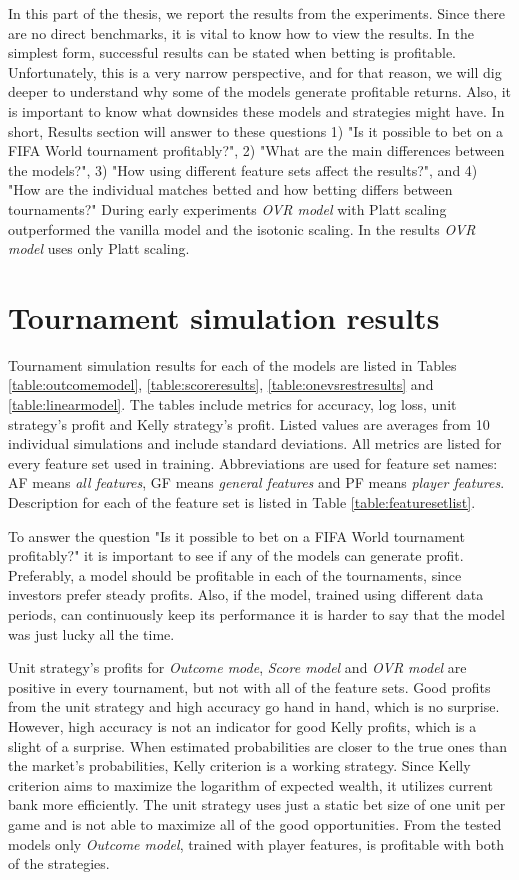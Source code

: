 In this part of the thesis, we report the results from the experiments. Since there are no direct benchmarks, it is vital to know how to view the results. In the simplest form, successful results can be stated when betting is profitable. Unfortunately, this is a very narrow perspective, and for that reason, we will dig deeper to understand why some of the models generate profitable returns. Also, it is important to know what downsides these models and strategies might have.  In short, Results section will answer to these questions 1) "Is it possible to bet on a FIFA World tournament profitably?",  2) "What are the main differences between the models?", 3) "How using different feature sets affect the results?", and 4) "How are the individual matches betted and how betting differs between tournaments?" During early experiments \textit{OVR model} with Platt scaling outperformed the vanilla model and the isotonic scaling. In the results \textit{OVR model} uses only Platt scaling.

\section{Tournament simulation results}
Tournament simulation results for each of the models are listed in Tables \ref{table:outcomemodel}, \ref{table:scoreresults}, \ref{table:onevsrestresults} and \ref{table:linearmodel}. The tables include metrics for accuracy, log loss, unit strategy's profit and Kelly strategy's profit. Listed values are averages from 10 individual simulations and include standard deviations. All metrics are listed for every feature set used in training. Abbreviations are used for feature set names: AF means \textit{all features}, GF means \textit{general features} and PF means \textit{player features}. Description for each of the feature set is listed in Table \ref{table:featuresetlist}.

To answer the question "Is it possible to bet on a FIFA World tournament profitably?" it is important to see if any of the models can generate profit. Preferably, a model should be profitable in each of the tournaments, since investors prefer steady profits. Also, if the model, trained using different data periods, can continuously keep its performance it is harder to say that the model was just lucky all the time.

Unit strategy's profits for \textit{Outcome mode}, \textit{Score model} and \textit{OVR model} are positive in every tournament, but not with all of the feature sets. Good profits from the unit strategy and high accuracy go hand in hand, which is no surprise. However, high accuracy is not an indicator for good Kelly profits, which is a slight of a surprise. When estimated probabilities are closer to the true ones than the market's probabilities, Kelly criterion is a working strategy. Since Kelly criterion aims to maximize the logarithm of expected wealth, it utilizes current bank more efficiently. The unit strategy uses just a static bet size of one unit per game and is not able to maximize all of the good opportunities. From the tested models only \textit{Outcome model}, trained with player features, is profitable with both of the strategies.

